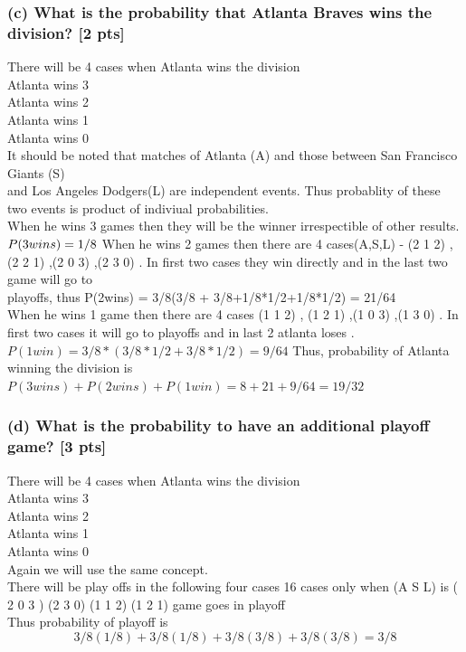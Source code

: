 \documentclass[twoside,10pt]{article}
\begin{document}
\subsubsection*{(c) What is the probability that Atlanta Braves wins the division? [2 pts]}
There will be 4 cases when Atlanta wins the division\\
Atlanta wins 3 \\
Atlanta wins 2\\
Atlanta wins 1\\
Atlanta wins 0\\[.30cm]
It should be noted that matches of Atlanta (A) and those between  San Francisco Giants (S) \\
 and  Los Angeles Dodgers(L) are independent events. Thus probablity of these two events is product of indiviual probabilities.\\
 When he wins 3 games then they will be the winner irrespectible of other results.\\
$
P(3wins) = 1/8 \\
$
When he wins 2 games then there are  4 cases(A,S,L) - (2 1 2) , (2 2 1) ,(2 0 3) ,(2 3 0) . In first two cases they win directly and in the last two game will go to\\ playoffs, thus P(2wins) = 3/8(3/8 + 3/8+1/8*1/2+1/8*1/2) = 21/64\\
When he wins 1 game then there are 4 cases (1 1 2) , (1 2 1) ,(1 0 3) ,(1 3 0) . In first two cases it will go to playoffs and in last 2 atlanta loses . \\
$
P(1win) = 3/8*(3/8*1/2 + 3/8*1/2)= 9/64
$
Thus, probability of  Atlanta winning the division is \\ $ P(3wins) +  P(2wins)+P(1win) = 8+21+9/64 = 19/32
$
\subsubsection*{(d) What is the probability to have an additional playoff game? [3 pts]}
There will be 4 cases when Atlanta wins the division\\
Atlanta wins 3 \\
Atlanta wins 2\\
Atlanta wins 1\\
Atlanta wins 0\\
Again we will use the same concept. \\
There will be play offs in the following four cases
 16 cases only when (A S L) is ( 2 0 3 ) (2 3 0)  (1 1 2) (1 2 1) game goes in playoff \\ 
Thus probability of playoff is $$3/8(1/8) +  3/8(1/8) +  3/8(3/8)  +  3/8(3/8) = 3/8$$
\newpage
\end{document}
